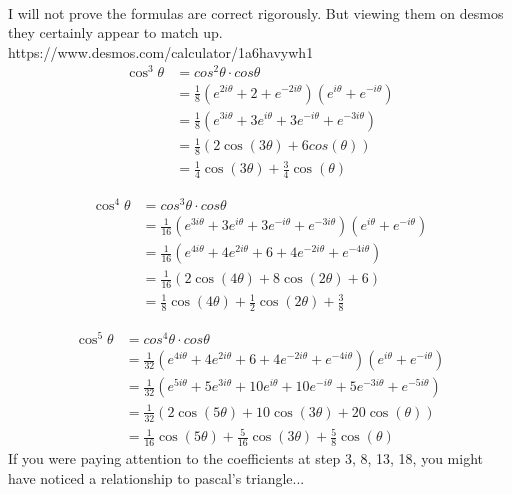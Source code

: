 \documentclass[12pt]{article}
\begin{document}
\\
I will not prove the formulas are correct rigorously. But viewing them on
desmos they certainly appear to match up. 
\\
https://www.desmos.com/calculator/1a6havywh1
\newpage
\begin{align}
\cos^3\theta &= cos^2\theta \cdot cos\theta
\\
&= \frac{1}{8}(e^{2i\theta} + 2 + e^{-2i\theta})(e^{i\theta} + e^{-i\theta})
\\
&= \frac{1}{8}(e^{3i\theta} + 3e^{i\theta} + 3e^{-i\theta} + e^{-3i\theta})
\\
&= \frac{1}{8}(2\cos(3\theta) + 6cos(\theta))
\\
&= \frac{1}{4}\cos(3\theta) + \frac{3}{4}\cos(\theta)
\end{align}

\begin{align}
\cos^4\theta &= cos^3\theta \cdot cos\theta
\\
&= \frac{1}{16}(e^{3i\theta} + 3e^{i\theta} + 3e^{-i\theta} + e^{-3i\theta})(e^{i\theta} + e^{-i\theta})
\\
&= \frac{1}{16}(e^{4i\theta} + 4e^{2i\theta} + 6 + 4e^{-2i\theta} + e^{-4i\theta})
\\
&= \frac{1}{16}(2\cos(4\theta) + 8\cos(2\theta) + 6)
\\
&= \frac{1}{8}\cos(4\theta) + \frac{1}{2}\cos(2\theta) + \frac{3}{8}
\end{align}

\begin{align}
\cos^5\theta &= cos^4\theta \cdot cos\theta
\\
&= \frac{1}{32}(e^{4i\theta} + 4e^{2i\theta} + 6 + 4e^{-2i\theta} + e^{-4i\theta})(e^{i\theta} + e^{-i\theta})
\\
&= \frac{1}{32}(e^{5i\theta} + 5e^{3i\theta} + 10e^{i\theta} + 10e^{-i\theta} + 5e^{-3i\theta} + e^{-5i\theta})
\\
&= \frac{1}{32}(2\cos(5\theta) + 10\cos(3\theta) + 20\cos(\theta))
\\
&= \frac{1}{16}\cos(5\theta) + \frac{5}{16}\cos(3\theta) + \frac{5}{8}\cos(\theta)
\end{align}
If you were paying attention to the coefficients at step 3, 8, 13, 18, you might have noticed a relationship to pascal's triangle...
\end{document}
